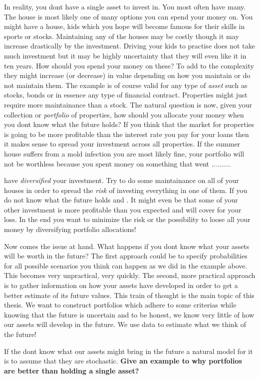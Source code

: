 \documentclass[]{book}
\begin{document}
{In reality, you dont have a single asset to invest in. 
You most often have many. 
The house is most likely one of many options you can spend your money on. 
You might have a house, kids which you hope will become famous for their skills in sports or stocks. 
Maintaining any of the houses may be costly though it may increase drastically by the investment. 
Driving your kids to practise does not take much investment but it may be highly uncertainty that they will even like it in ten years. 
How should you spend your money on these?
To add to the complexity they might increase (or decrease) in value depending on how you maintain or do not maintain them.
The example is of course valid for any type of \textit{asset} such as stocks, bonds or in essence any type of financial contract. 
Properties might just require more maintainance than a stock.
The natural question is now, given your collection or \textit{portfolio} of properties, how should you allocate your money when you dont know what the future holds? 
If you think that the market for properties is going to be more profitable than the interest rate you pay for your loans then it makes sense to spread your investment across all properties. 
If the summer house suffers from a mold infection you are most likely fine, your portfolio will not be worthless because you spent money on something that went ..........

 have \textit{diversified} your investment.
Try to do some maintainance on all of your houses in order to spread the \textit{risk} of investing everything in one of them. 
If you do not know what the future holds and . It might even be that some of your other investment is more profitable than you expected and will cover for your loss. In the end you want to minimize the risk or the possibility to loose all your money by diversifying portfolio allocations!

Now comes the issue at hand. 
What happens if you dont know what your assets will be worth in the future?
The first approach could be to specify probabilities for all possible scenarios you think can happen as we did in the example above.
This becomes very unpractical, very quickly. 
The second, more practical approach is to gather information on how your assets have developed in order to get a better estimate of its future values.
This train of thought is the main topic of this thesis. 
We want to construct portfolios which adhere to some criterias while knowing that the future is uncertain and to be honest, we know very little of how our assets will develop in the future. We use data to estimate what we think of the future!

If the dont know what our assets might bring in the future a natural model for it is to assume that they are stochastic. \textbf{Give an example to why portfolios are better than holding a single asset?}
}
\end{document}

